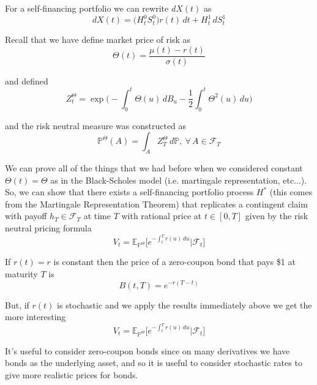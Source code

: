 \documentclass[12pt]{article}
\newlength\tindent
\renewcommand{\indent}{\hspace*{\tindent}}
\begin{document}
For a self-financing portfolio we can rewrite $dX(t)$ as
\begin{equation*}
	dX(t) = \big(H^0_tS^0_t\big)r(t)\,dt + H^1_t\,dS^1_t
\end{equation*}

Recall that we have define market price of risk as
\begin{equation*}
	\Theta(t) = \frac{\mu(t) - r(t)}{\sigma(t)}
\end{equation*}

and defined
\begin{equation*}
	Z^\Theta_t = \exp\Big(-\int^t_0\Theta(u)\,dB_u - \frac{1}{2}\int^t_0\Theta^2(u)\,du \Big)
\end{equation*}

and the risk neutral measure was constructed as
\begin{equation*}
	\mathbb P^{\Theta}(A) = \int_A Z^\Theta_T\,d\mathbb P,~\forall\,A\in\mathcal F_T
\end{equation*}

\indent We can prove all of the things that we had before when we considered constant $\Theta(t) = \Theta$ as in the Black-Scholes model (i.e. martingale representation, etc...). So, we can show that there exists a self-financing portfolio process $H^*$ (this comes from the Martingale Representation Theorem) that replicates a contingent claim with payoff $h_T \in \mathcal F_T$ at time $T$ with rational price at $t\in[0,T]$ given by the risk neutral pricing formula
\begin{equation*}
	V_t = \mathbb E_{\mathbb P^\Theta}\big[e^{-\int^T_t r(u)\,du} \big|\mathcal F_t\big]
\end{equation*}

\indent If $r(t) = r$ is constant then the price of a zero-coupon bond that pays \$1 at maturity $T$ is
\begin{equation*}
	B(t,T) = e^{-r(T - t)}
\end{equation*}

\indent But, if $r(t)$ is stochastic and we apply the results immediately above we get the more interesting
\begin{equation*}
	V_t = \mathbb E_{\mathbb P^\Theta}\big[e^{-\int^T_t r(u)\,du} \big|\mathcal F_t\big]
\end{equation*}

\indent It's useful to consider zero-coupon bonds since on many derivatives we have bonds as the underlying asset, and so it is useful to consider stochastic rates to give more realistic prices for bonds.
\end{document}
